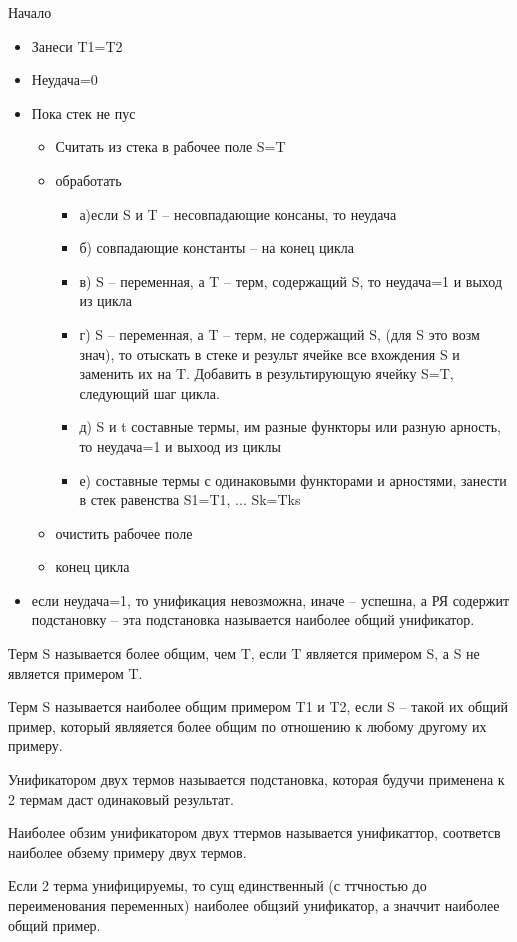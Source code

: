 \documentclass[12pt]{report}
\begin{document}
Начало
\begin{itemize}
	\item Занеси T1=T2
	\item Неудача=0
	\item Пока стек не пус
	\begin{itemize}
		\item Считать из стека в рабочее поле S=T
		\item обработать 
		\begin{itemize}
			\item а)если  S и T -- несовпадающие консаны, то неудача
		\item б) совпадающие константы -- на конец цикла
		\item в) S -- переменная, а T -- терм, содержащий S, то неудача=1 и выход из цикла
		\item г) S -- переменная, а T -- терм, не содержащий S, (для S это возм знач), то отыскать в стеке и результ ячейке все  вхождения S и заменить их на T. Добавить в результирующую ячейку S=T, следующий шаг цикла.
		\item д) S и t составные термы,  им разные функторы или разную арность, то неудача=1 и выхоод из циклы
		\item е) составные термы с одинаковыми функторами и арностями, занести в стек равенства S1=T1, ... Sk=Tks
		\end{itemize}
		\item очистить рабочее поле
		\item конец цикла
	\end{itemize}
\item если неудача=1, то унификация невозможна, иначе -- успешна,  а РЯ содержит подстановку -- эта подстановка называется наиболее общий унификатор. 
\end{itemize}

Терм S называется более общим, чем T, если  T является примером S, а S не является примером T.

Терм S называется наиболее общим примером T1 и T2, если S -- такой их общий пример, который являяется более общим по отношению к любому другому их примеру.

Унификатором двух термов называется подстановка, которая будучи применена к 2 термам даст одинаковый результат.

Наиболее обзим унификатором двух ттермов называется унификаттор, соответсв наиболее обзему примеру двух термов.

Если  2 терма унифицируемы, то сущ единственный (с ттчностью до переименования переменных) наиболее общзий унификатор, а значчит наиболее общий пример.
\end{document}
